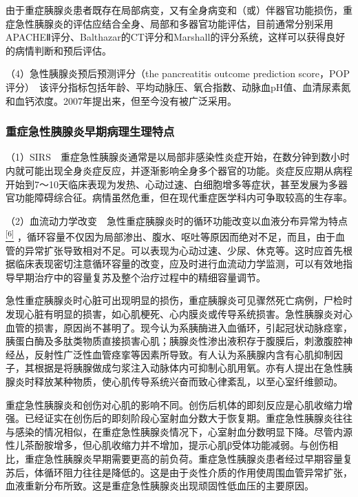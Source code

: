 由于重症胰腺炎患者既存在局部病变，又有全身病变和（或）伴器官功能损伤，重症急性胰腺炎的评估应结合全身、局部和多器官功能评估，目前通常分别采用APACHEⅡ评分、Balthazar的CT评分和Marshall的评分系统，这样可以获得良好的病情判断和预后评估。

（4）急性胰腺炎预后预测评分（the pancreatitis outcome prediction
score，POP评分）　该评分指标包括年龄、平均动脉压、氧合指数、动脉血pH值、血清尿素氮和血钙浓度。2007年提出来，但至今没有被广泛采用。

\subsubsection{重症急性胰腺炎早期病理生理特点}

（1）SIRS　重症急性胰腺炎通常是以局部非感染性炎症开始，在数分钟到数小时内就可能出现全身炎症反应，并逐渐影响全身多个器官的功能。炎症反应期从病程开始到7～10天临床表现为发热、心动过速、白细胞增多等症状，甚至发展为多器官功能障碍综合征。病情虽然危重，但在现代重症医学科内可争取较高的生存率。

（2）血流动力学改变　急性重症胰腺炎时的循环功能改变以血液分布异常为特点
\protect\hyperlink{text00021.htmlux5cux23ch6-20}{\textsuperscript{{[}6{]}}}
，循环容量不仅因为局部渗出、腹水、呕吐等原因而绝对不足，而且，由于血管的异常扩张导致相对不足。可以表现为心动过速、少尿、休克等。这时应首先根据临床表现密切注意循环容量的改变，应及时进行血流动力学监测，可以有效地指导早期治疗中的容量复苏及整个治疗过程中的精细容量调节。

急性重症胰腺炎时心脏可出现明显的损伤，重症胰腺炎可见骤然死亡病例，尸检时发现心脏有明显的损害，如心肌梗死、心内膜炎或传导系统损害。急性胰腺炎对心血管的损害，原因尚不甚明了。现今认为系胰酶进入血循环，引起冠状动脉痉挛，胰蛋白酶及多肽类物质直接损害心肌；胰腺炎性渗出液积存于腹膜后，刺激腹腔神经丛，反射性广泛性血管痉挛等因素所导致。有人认为系胰腺内含有心肌抑制因子，其根据是将胰腺做成匀浆注入动脉体内可抑制心肌用氧。亦有人提出在急性胰腺炎时释放某种物质，使心肌传导系统兴奋而致心律紊乱，以至心室纤维颤动。

重症急性胰腺炎和创伤对心肌的影响不同。创伤后机体的即刻反应是心肌收缩力增强。已经证实在创伤后的即刻阶段心室射血分数大于恢复期。重症急性胰腺炎往往与感染的情况相似，在重症急性胰腺炎情况下，心室射血分数明显下降。尽管内源性儿茶酚胺增多，但心肌收缩力并不增加，提示心肌β受体功能减弱。与创伤相比，重症急性胰腺炎早期需要更高的前负荷。重症急性胰腺炎患者经过早期容量复苏后，体循环阻力往往是降低的。这是由于炎性介质的作用使周围血管异常扩张，血液重新分布所致。这是重症急性胰腺炎出现顽固性低血压的主要原因。

